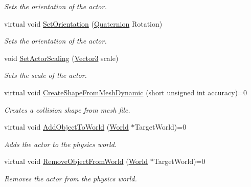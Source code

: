 \begin{DoxyCompactItemize}
\begin{DoxyCompactList}\small\item\em Sets the orientation of the actor. \item\end{DoxyCompactList}\item 
virtual void \hyperlink{classphys_1_1ActorBase_ac4b0bf1eff730d94f72d04957efea69d}{SetOrientation} (\hyperlink{classphys_1_1Quaternion}{Quaternion} Rotation)
\begin{DoxyCompactList}\small\item\em Sets the orientation of the actor. \item\end{DoxyCompactList}\item 
void \hyperlink{classphys_1_1ActorBase_a1ac7c692d7f88f39ebb1c1db5deba251}{SetActorScaling} (\hyperlink{classphys_1_1Vector3}{Vector3} scale)
\begin{DoxyCompactList}\small\item\em Sets the scale of the actor. \item\end{DoxyCompactList}\item 
virtual void \hyperlink{classphys_1_1ActorBase_aa41370f6d2031a9dad8df45bd7f3bcc6}{CreateShapeFromMeshDynamic} (short unsigned int accuracy)=0
\begin{DoxyCompactList}\small\item\em Creates a collision shape from mesh file. \item\end{DoxyCompactList}\item 
virtual void \hyperlink{classphys_1_1ActorBase_a3d28e4c4a33f50210101695cb33ded3b}{AddObjectToWorld} (\hyperlink{classphys_1_1World}{World} $\ast$TargetWorld)=0
\begin{DoxyCompactList}\small\item\em Adds the actor to the physics world. \item\end{DoxyCompactList}\item 
virtual void \hyperlink{classphys_1_1ActorBase_aaa787de7ec5d7d1d8428ea78f37bcb40}{RemoveObjectFromWorld} (\hyperlink{classphys_1_1World}{World} $\ast$TargetWorld)=0
\begin{DoxyCompactList}\small\item\em Removes the actor from the physics world. \item\end{DoxyCompactList}\item 

\end{DoxyCompactItemize}
